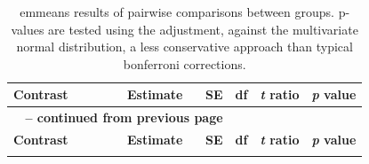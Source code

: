 \documentclass[12pt, letterpaper, ]{report}
\begin{document}
\begin{center}
\begin{longtable}{lrrrrr}
        \caption{emmeans results of pairwise comparisons between groups. p-values are tested using the  adjustment, against the  multivariate normal distribution, a less conservative approach than typical bonferroni corrections.}
        \label{Tab:emm_params}
            \\ \hline
            \textbf{Contrast} & \textbf{Estimate} & \textbf{SE} & \textbf{df} & \textbf{\textit{t} ratio} & \textbf{\textit{p} value} 
            \\ \hline
            \endfirsthead
            \multicolumn{3}{c}{{\bfseries \tablename\ \thetable{} -- continued from previous page}}
            \\ \hline
            \textbf{Contrast} & \textbf{Estimate} & \textbf{SE} & \textbf{df} & \textbf{\textit{t} ratio} & \textbf{\textit{p} value} 
            \\ \hline
            \endhead
            \hline
            \endfoot
            \hline
            \hline
            \endlastfoot


\end{longtable}
\end{center}
\end{document}
